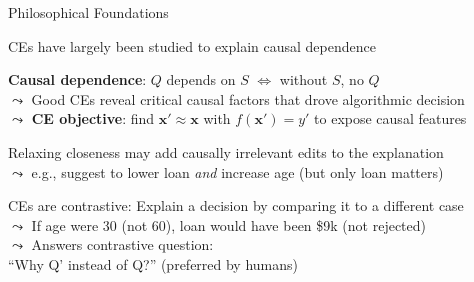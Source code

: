 \documentclass[10pt,compress,t,notes=noshow, xcolor=table]{beamer}
\begin{document}
\begin{framev}[align=top]{Philosophical Foundations}
\begin{itemizeM}
\item<1-> CEs have largely been studied to explain causal dependence
\item<1-> \textbf{Causal dependence}: $Q$ depends on $S$ $\Leftrightarrow$ without $S$, no $Q$\\
$\leadsto$ Good CEs reveal critical causal factors that drove algorithmic decision\\
$\leadsto$ \textbf{CE objective}: find $\mathbf{x}' \!\approx\! \mathbf{x}$ with $f(\mathbf{x}') = y'$ to expose causal features
\item<2-> Relaxing closeness may add causally irrelevant edits to the explanation\\
$\leadsto$ e.g., suggest to lower loan \emph{and} increase age (but only loan matters)
\item<3-> CEs are contrastive: Explain a decision by comparing it to a different case\\
$\leadsto$ If age were 30 (not 60), loan would have been \$9k (not rejected)\\%
$\leadsto$ Answers contrastive question: \\``Why Q' instead of Q?'' (preferred by humans)
\end{itemizeM}
\end{framev}



\end{document}
